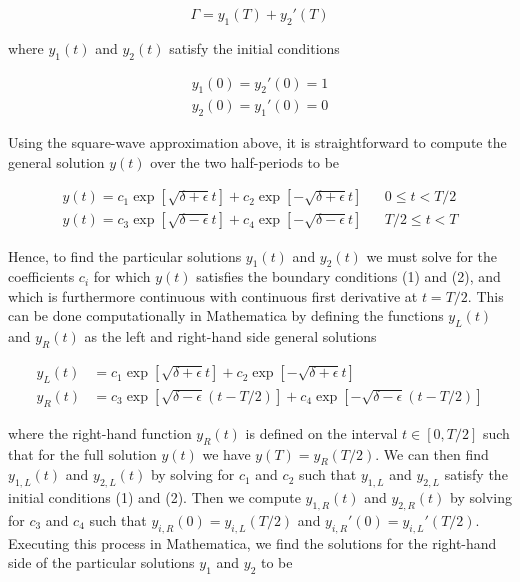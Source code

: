 \documentclass[12pt, a4paper]{article}
\begin{document}
\begin{enumerate}
\begin{enumerate}
        $$\Gamma = y_1(T) + y_2'(T)$$

        where $y_1(t)$ and $y_2(t)$ satisfy the initial conditions 

        \begin{align}
            y_1(0)= y_2'(0)=1 \\ y_2(0)= y_1'(0)=0
        \end{align}

        Using the square-wave approximation above, it is straightforward to compute the general solution $y(t)$ over the two half-periods to be 

        \begin{align*}
            y(t) = c_1 \exp \left[ \sqrt{\delta+\epsilon} t \right] + c_2 \exp \left[-\sqrt{\delta + \epsilon} t \right] && 0 \le t < T/2 \\
            y(t) = c_3 \exp \left[ \sqrt{\delta-\epsilon} t \right] + c_4 \exp \left[-\sqrt{\delta - \epsilon} t \right] && T/2 \le t < T
        \end{align*}

        Hence, to find the particular solutions $y_1(t)$ and $y_2(t)$ we must solve for the coefficients $c_i$ for which $y(t)$ satisfies the boundary conditions (1) and (2), and which is furthermore continuous with continuous first derivative at $t = T/2$. This can be done computationally in Mathematica by defining the functions $y_L(t)$ and $y_R(t)$ as the left and right-hand side general solutions 

        \begin{align*}
            y_L(t) &= c_1 \exp \left[\sqrt{\delta +\epsilon } t \right]+c_2 \exp \left[-\sqrt{\delta +\epsilon }t\right] \\
            y_R(t) &= c_3 \exp \left[\sqrt{\delta -\epsilon } \left(t-T/2\right)\right]+c_4 \exp \left[-\sqrt{\delta -\epsilon } \left(t-T/2\right)\right]
        \end{align*}

        where the right-hand function $y_R(t)$ is defined on the interval $t \in [0, T/2]$ such that for the full solution $y(t)$ we have $y(T)= y_R(T/2)$. We can then find $y_{1,L}(t)$ and $y_{2,L}(t)$ by solving for $c_1$ and $c_2$ such that $y_{1,L}$ and $y_{2,L}$ satisfy the initial conditions (1) and (2). Then we compute $y_{1,R}(t)$ and $y_{2,R}(t)$ by solving for $c_3$ and $c_4$ such that $y_{i,R}(0) = y_{i,L}(T/2)$ and ${y_{i,R}}'(0)={y_{i,L}}'(T/2)$. Executing this process in Mathematica, we find the solutions for the right-hand side of the particular solutions $y_1$ and $y_2$ to be


\end{enumerate}
\end{enumerate}
\end{document}
